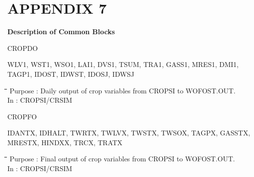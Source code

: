 \section{  APPENDIX 7  }

\bigskip
{\bf {\large Description of Common Blocks}}

\bigskip
CROPDO
\testlastline

\begin{indenting}{2.54cm}
WLV1, WST1, WSO1, LAI1, DVS1, TSUM, TRA1, GASS1, MRES1, DMI1, TAGP1, IDOST,
IDWST, IDOSJ, IDWSJ
\end{indenting}
\begin{tabbing}
\hspace{1.27cm}\=\hspace{1.27cm}\=\hspace{1.27cm}\=\hspace{1.27cm}\=%
\hspace{1.27cm}\=\hspace{1.27cm}\=\hspace{1.27cm}\=\hspace{1.27cm}\=%
\hspace{1.27cm}\=\hspace{1.27cm}\=\kill
\>\> Purpose\> : Daily output of crop variables from CROPSI to WOFOST.OUT.\\
\>\> In\> : CROPSI/CRSIM
\end{tabbing}

\bigskip
CROPFO
\testlastline

\begin{indenting}{2.54cm}
IDANTX, IDHALT, TWRTX, TWLVX, TWSTX, TWSOX, TAGPX, GASSTX, MRESTX, HINDXX,
TRCX, TRATX
\end{indenting}
\begin{tabbing}
\hspace{1.27cm}\=\hspace{1.27cm}\=\hspace{1.27cm}\=\hspace{1.27cm}\=%
\hspace{1.27cm}\=\hspace{1.27cm}\=\hspace{1.27cm}\=\hspace{1.27cm}\=%
\hspace{1.27cm}\=\hspace{1.27cm}\=\kill
\>\> Purpose\> : Final output of crop variables from CROPSI to WOFOST.OUT.\\
\>\> In\> : CROPSI/CRSIM
\end{tabbing}


